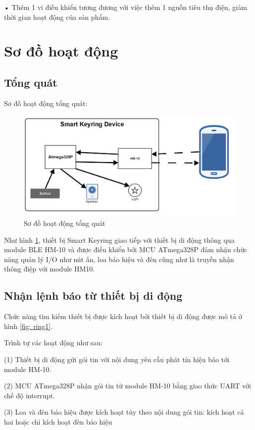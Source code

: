 • Thêm 1 vi điều khiển tương đương với việc thêm 1 nguồn tiêu thụ điện, giảm thời gian hoạt động của sản phẩm.

\section{Sơ đồ hoạt động}
\subsection{Tổng quát}
Sơ đồ hoạt động tổng quát:

\begin{figure}[h]
	\centering    
	\includegraphics[width=1.0\textwidth]{general}
	\caption[Sơ đồ hoạt động tổng quát]{Sơ đồ hoạt động tổng quát}
	\label{fig: general}
\end{figure}

Như hình \ref{fig: general}, thiết bị Smart Keyring giao tiếp với thiết bị di động thông qua module BLE HM-10 và được điều khiển bởi MCU ATmega328P đảm nhận chức năng quản lý I/O như nút ấn, loa báo hiệu và đèn cũng như là truyền nhận thông điệp với module HM10.

\subsection{Nhận lệnh báo từ thiết bị di động}

Chức năng tìm kiếm thiết bị được kích hoạt bởi thiết bị di động được mô tả ở hình \ref{fig: ring1}.

Trình tự các hoạt động như sau:

(1) Thiết bị di động gửi gói tin với nội dung yêu cầu phát tín hiệu báo tới module HM-10.

(2) MCU ATmega328P nhận gói tin từ module HM-10 bằng giao thức UART với chế độ interrupt.

(3) Loa và đèn báo hiệu được kích hoạt tùy theo nội dung gói tin: kích hoạt cả hai hoặc chỉ kích hoạt đèn báo hiệu

